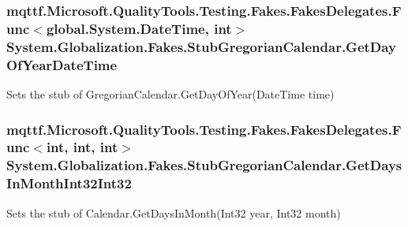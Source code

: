 \hypertarget{class_system_1_1_globalization_1_1_fakes_1_1_stub_gregorian_calendar_a9cbc4a73991afeb4a8a2c8084d06d5f9}{
\subsubsection[{Get\-Day\-Of\-Year\-Date\-Time}]{\setlength{\rightskip}{0pt plus 5cm}mqttf.\-Microsoft.\-Quality\-Tools.\-Testing.\-Fakes.\-Fakes\-Delegates.\-Func$<$global.\-System.\-Date\-Time, int$>$ System.\-Globalization.\-Fakes.\-Stub\-Gregorian\-Calendar.\-Get\-Day\-Of\-Year\-Date\-Time}}\label{class_system_1_1_globalization_1_1_fakes_1_1_stub_gregorian_calendar_a9cbc4a73991afeb4a8a2c8084d06d5f9}


Sets the stub of Gregorian\-Calendar.\-Get\-Day\-Of\-Year(\-Date\-Time time)

\hypertarget{class_system_1_1_globalization_1_1_fakes_1_1_stub_gregorian_calendar_a306767364eafecc5eb1287eb58aace07}{
\subsubsection[{Get\-Days\-In\-Month\-Int32\-Int32}]{\setlength{\rightskip}{0pt plus 5cm}mqttf.\-Microsoft.\-Quality\-Tools.\-Testing.\-Fakes.\-Fakes\-Delegates.\-Func$<$int, int, int$>$ System.\-Globalization.\-Fakes.\-Stub\-Gregorian\-Calendar.\-Get\-Days\-In\-Month\-Int32\-Int32}}\label{class_system_1_1_globalization_1_1_fakes_1_1_stub_gregorian_calendar_a306767364eafecc5eb1287eb58aace07}


Sets the stub of Calendar.\-Get\-Days\-In\-Month(\-Int32 year, Int32 month)


